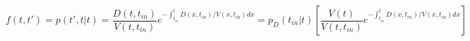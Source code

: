 \begin{equation}
f(t,t') = p(t',t|t)=  \frac{D(t,t_{in})}{V(t,t_{in})}e^{-\int_{t_{in}}^t D(x,t_{in})/V(x,t_{in}) dx} = p_D(t_{in}|t)\left[ \frac{V(t)}{V(t,t_{in})} e^{-\int_{t_{in}}^t D(x,t_{in})/V(x,t_{in}) dx}\right]
\end{equation}